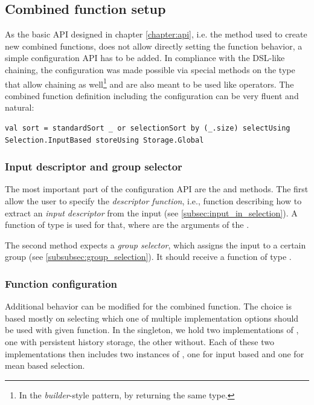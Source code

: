 \subsection{Combined function setup}
\label{subsec:function_setup}

As the basic API designed in chapter \ref{chapter:api}, i.e. the  method used to create new combined functions, does not allow directly setting the function behavior, a simple configuration API has to be added. In compliance with the DSL-like  chaining, the configuration was made possible via special methods on the  type that allow chaining as well\footnote{In the \textit{builder}-style pattern, by returning the same type.} and are also meant to be used like operators. The combined function definition including the configuration can be very fluent and natural:

\lstset{style=Scala}
\begin{lstlisting}
val sort = standardSort _ or selectionSort by (_.size) selectUsing Selection.InputBased storeUsing Storage.Global
\end{lstlisting}

\subsubsection{Input descriptor and group selector}

The most important part of the configuration API are the  and  methods. The first allow the user to specify the \textit{descriptor function}, i.e., function describing how to extract an \textit{input descriptor} from the input (see \ref{subsec:input_in_selection}). A function of type  is used for that, where  are the arguments of the . 

The second method expects a \textit{group selector}, which assigns the input to a certain group (see \ref{subsubsec:group_selection}). It should receive a function of type .

\subsubsection{Function configuration}

Additional behavior can be modified for the combined function. The choice is based mostly on selecting which one of multiple implementation options should be used with given function. In the  singleton, we hold two implementations of , one with persistent history storage, the other without. Each of these two implementations then includes two instances of  , one for input based and one for mean based selection.

